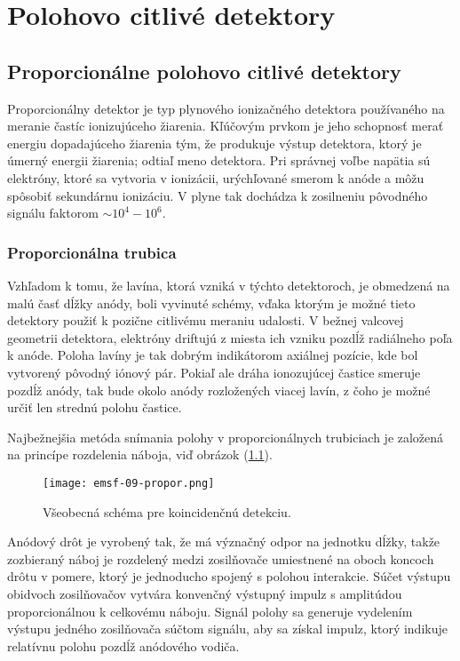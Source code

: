\documentclass[../../main.tex]{subfiles}
\begin{document}
\chapter{Polohovo citlivé detektory}

\section{Proporcionálne polohovo citlivé detektory}
Proporcionálny detektor je typ plynového ionizačného detektora používaného na meranie častíc ionizujúceho žiarenia. Kľúčovým prvkom je jeho schopnosť merať energiu dopadajúceho žiarenia tým, že produkuje výstup detektora, ktorý je úmerný energii žiarenia; odtiaľ meno detektora. Pri správnej voľbe napätia sú elektróny, ktoré sa vytvoria v ionizácii, urýchľované smerom k anóde a môžu spôsobiť sekundárnu ionizáciu. V plyne tak dochádza k zosilneniu pôvodného signálu faktorom $\sim 10^4 - 10^6$. 

\subsection{Proporcionálna trubica}
Vzhľadom k tomu, že lavína, ktorá vzniká v týchto detektoroch, je obmedzená na malú časť dĺžky anódy, boli vyvinuté schémy, vďaka ktorým je možné tieto detektory použiť k pozične citlivému meraniu udalosti. V bežnej valcovej geometrii detektora, elektróny driftujú z miesta ich vzniku pozdĺž radiálneho poľa k anóde. Poloha lavíny je tak dobrým indikátorom axiálnej pozície, kde bol vytvorený pôvodný iónový pár. Pokiaľ ale dráha ionozujúcej častice smeruje pozdĺž anódy, tak bude okolo anódy rozložených viacej lavín, z čoho je možné určiť len strednú polohu častice.

Najbežnejšia metóda snímania polohy v proporcionálnych trubiciach je založená na
princípe rozdelenia náboja, viď obrázok (\ref{em9:fig:propor}).

\begin{figure}[!h]
\texttt{[image: emsf-09-propor.png]}
\centering
\caption{Všeobecná schéma pre koincidenčnú detekciu.}
\label{em9:fig:propor}
\end{figure}

Anódový drôt je vyrobený tak, že má význačný odpor na jednotku dĺžky, takže zozbieraný náboj je rozdelený medzi zosilňovače umiestnené na oboch koncoch drôtu v pomere, ktorý je jednoducho spojený s polohou interakcie. Súčet výstupu obidvoch zosilňovačov vytvára konvenčný výstupný impulz s amplitúdou proporcionálnou k celkovému náboju. Signál polohy sa generuje vydelením výstupu jedného zosilňovača súčtom signálu, aby sa získal impulz, ktorý indikuje relatívnu polohu pozdĺž anódového vodiča.
\end{document}
